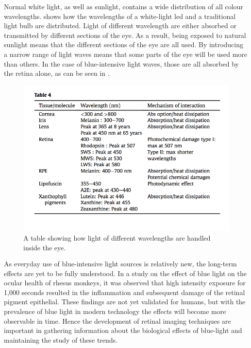 Normal white light, as well as sunlight, contains a wide distribution of all colour
wavelengths.  shows how the wavelengths of a white-light \Gls{led} and a
traditional light bulb are distributed. Light of different wavelength are either absorbed
or transmitted by different sections of the eye. As a result, being exposed to natural
sunlight means that the different sections of the eye are all used. By introducing a
narrow range of light waves means that some parts of the eye will be used more than
others. In the case of blue-intensive light waves, those are all absorbed by
the retina alone, as can be seen in .

\begin{figure}[H]
\centering
\includegraphics{figures/wavelength}
\caption{A table showing how light of different wavelengths are handled inside the eye.\cite{behar_cohen_2011}}
\label{fig:wl}
\end{figure}

As everyday use of blue-intensive light sources is relatively new, the long-term
effects are yet to be fully understood. In a study on the effect of blue light on the
ocular health of rhesus monkeys, it was observed that high intensity exposure
for 1,000 seconds resulted in the inflammation and subsequent damage of the
retinal pigment epithelial. \cite{ham1980nature} These findings are not yet
validated for humans, but with the prevalence of blue light in modern technology
the effects will become more observable in time. Hence the development of retinal
imaging techniques are important in gathering information about the biological
effects of blue-light and maintaining the study of these trends.

